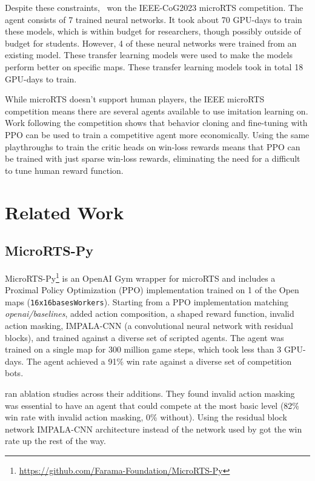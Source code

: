 \documentclass{article}
\begin{document}
Despite these constraints, \agentName\ won the IEEE-CoG2023 microRTS competition. The
agent consists of 7 trained neural networks. It took about 70 GPU-days to train these
models, which is within budget for researchers, though possibly outside of budget for
students. However, 4 of these neural networks were trained from an existing model. These
transfer learning models were used to make the models perform better on specific maps.
These transfer learning models took in total 18 GPU-days to train.

While microRTS doesn't support human players, the IEEE microRTS competition means there
are several agents available to use imitation learning on. Work following the
competition shows that behavior cloning and fine-tuning with PPO can be used to train a
competitive agent more economically. Using the same playthroughs to train the critic
heads on win-loss rewards means that PPO can be trained with just sparse win-loss
rewards, eliminating the need for a difficult to tune human reward function.

\section{Related Work}
\subsection{MicroRTS-Py}
MicroRTS-Py\footnote{\url{https://github.com/Farama-Foundation/MicroRTS-Py}} is an OpenAI Gym
wrapper for microRTS and includes a Proximal Policy Optimization (PPO) implementation
trained on 1 of the Open maps (\texttt{16x16basesWorkers}). Starting from a PPO
implementation matching \textit{openai/baselines},
\citet{DBLP:journals/corr/abs-2105-13807} added action composition, a shaped reward function, invalid action
masking, IMPALA-CNN (a convolutional neural network with residual blocks), and trained
against a diverse set of scripted agents. The agent was trained on a single map for 300
million game steps, which took less than 3 GPU-days. The agent achieved a
91\% win rate against a diverse set of competition bots.

\citet{DBLP:journals/corr/abs-2105-13807} ran ablation studies across their additions.
They found invalid action masking was essential to have an agent that could compete at
the most basic level (82\% win rate with invalid action masking, 0\% without). Using the
residual block network IMPALA-CNN architecture instead of the network used by
\citet{DBLP:journals/corr/MnihKSGAWR13} got the win rate up the rest of the way.
\end{document}

